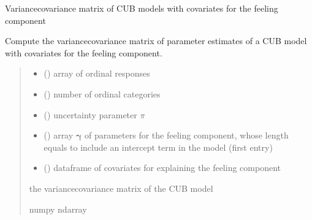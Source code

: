 \documentclass[letterpaper,10pt,english]{sphinxmanual}
\begin{document}
\begin{fulllineitems}
\label{\detokenize{cubmods:cubmods.cub_0w.varcov}}
\pysigstartsignatures
{}
\pysigstopsignatures
\sphinxAtStartPar
Variance\sphinxhyphen{}covariance matrix of CUB models with covariates for the feeling component

\sphinxAtStartPar
Compute the variance\sphinxhyphen{}covariance matrix of parameter estimates of a CUB model
with covariates for the feeling component.
\begin{quote}\begin{description}
\begin{itemize}
\item {} 
\sphinxAtStartPar
{} () \textendash{} array of ordinal responses

\item {} 
\sphinxAtStartPar
{} () \textendash{} number of ordinal categories

\item {} 
\sphinxAtStartPar
{} () \textendash{} uncertainty parameter \(\pi\)

\item {} 
\sphinxAtStartPar
{} () \textendash{} array \(\pmb \gamma\) of parameters for the feeling component, whose length equals 
 to include an intercept term in the model (first entry)

\item {} 
\sphinxAtStartPar
{} () \textendash{} dataframe of covariates for explaining the feeling component

\end{itemize}

\sphinxAtStartPar
the variance\sphinxhyphen{}covariance matrix of the CUB model

\sphinxAtStartPar
numpy ndarray

\end{description}\end{quote}

\end{fulllineitems}
\end{document}
